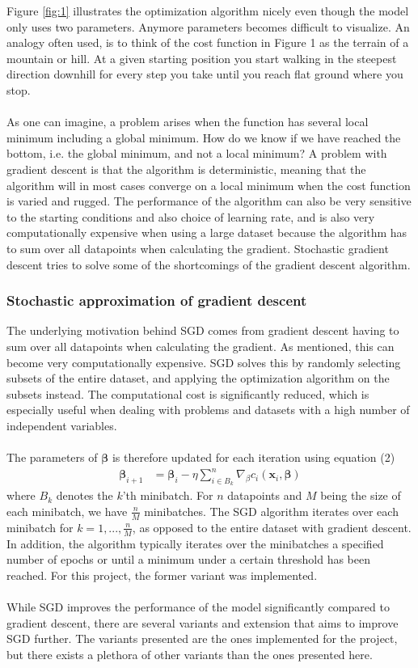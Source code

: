 \documentclass[a4paper,twocolumn]{article}
\newcommand{\B}{\boldsymbol{\beta}}
\begin{document}
Figure \ref{fig:1} illustrates the optimization algorithm nicely even though the model only uses two parameters. Anymore parameters becomes difficult to visualize. An analogy often used, is to think of the cost function in Figure 1 as the terrain of a mountain or hill. At a given starting position you start walking in the steepest direction downhill for every step you take until you reach flat ground where you stop.\\
\\
As one can imagine, a problem arises when the function has several local minimum including a global minimum. How do we know if we have reached the bottom, i.e. the global minimum, and not a local minimum? A problem with gradient descent is that the algorithm is deterministic, meaning that the algorithm will in most cases converge on a local minimum when the cost function is varied and rugged. The performance of the algorithm can also be very sensitive to the starting conditions and also choice of learning rate, and is also very computationally expensive when using a large dataset because the algorithm has to sum over all datapoints when calculating the gradient. Stochastic gradient descent tries to solve some of the shortcomings of the gradient descent algorithm. 
\subsubsection{Stochastic approximation of gradient descent}
The underlying motivation behind SGD comes from gradient descent having to sum over all datapoints when calculating the gradient. As mentioned, this can become very computationally expensive. SGD solves this by randomly selecting subsets of the entire dataset, and applying the optimization algorithm on the subsets instead. The computational cost is significantly reduced, which is especially useful when dealing with problems and datasets with a high number of independent variables.\\
\\
The parameters of $\B$ is therefore updated for each iteration using equation (2)
\begin{align}
    \B_{i + 1} &= \B_{i} - \eta \sum_{i \in B_{k}}^{n}\nabla_{\beta} c_{i}(\mathbf{x}_{i}, \B)
\end{align}
where $B_{k}$ denotes the $k$'th minibatch. For $n$ datapoints and $M$ being the size of each minibatch, we have $\frac{n}{M}$ minibatches. The SGD algorithm iterates over each minibatch for $k = 1, . . ., \frac{n}{M}$, as opposed to the entire dataset with gradient descent. In addition, the algorithm typically iterates over the minibatches a specified number of epochs or until a minimum under a certain threshold has been reached. For this project, the former variant was implemented.\\
\\
While SGD improves the performance of the model significantly compared to gradient descent, there are several variants and extension that aims to improve SGD further. The variants presented are the ones implemented for the project, but there exists a plethora of other variants than the ones presented here.
\end{document}

